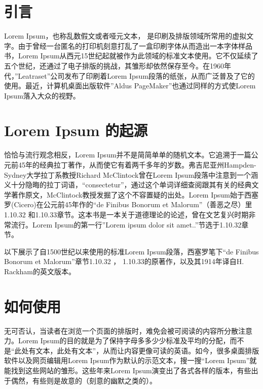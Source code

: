 \documentclass[UTF8]{ctexbook}
\begin{document}
\chapter*{引言}

Lorem Ipsum，也称乱数假文或者哑元文本， 是印刷及排版领域所常用的虚拟文字。由于曾经一台匿名的打印机刻意打乱了一盒印刷字体从而造出一本字体样品书，Lorem Ipsum从西元15世纪起就被作为此领域的标准文本使用。它不仅延续了五个世纪，还通过了电子排版的挑战，其雏形却依然保存至今。在1960年代，”Leatraset”公司发布了印刷着Lorem Ipsum段落的纸张，从而广泛普及了它的使用。最近，计算机桌面出版软件”Aldus PageMaker”也通过同样的方式使Lorem Ipsum落入大众的视野。

\chapter{Lorem Ipsum 的起源}

恰恰与流行观念相反，Lorem Ipsum并不是简简单单的随机文本。它追溯于一篇公元前45年的经典拉丁著作，从而使它有着两千多年的岁数。弗吉尼亚州Hampden-Sydney大学拉丁系教授Richard McClintock曾在Lorem Ipsum段落中注意到一个涵义十分隐晦的拉丁词语，“consectetur”，通过这个单词详细查阅跟其有关的经典文学著作原文，McClintock教授发掘了这个不容置疑的出处。Lorem Ipsum始于西塞罗(Cicero)在公元前45年作的“de Finibus Bonorum et Malorum”（善恶之尽）里1.10.32 和1.10.33章节。这本书是一本关于道德理论的论述，曾在文艺复兴时期非常流行。Lorem Ipsum的第一行”Lorem ipsum dolor sit amet..”节选于1.10.32章节。

以下展示了自1500世纪以来使用的标准Lorem Ipsum段落，西塞罗笔下“de Finibus Bonorum et Malorum”章节1.10.32 ， 1.10.33的原著作，以及其1914年译自H. Rackham的英文版本。

\chapter{如何使用}

无可否认，当读者在浏览一个页面的排版时，难免会被可阅读的内容所分散注意力。Lorem Ipsum的目的就是为了保持字母多多少少标准及平均的分配，而不是“此处有文本，此处有文本”，从而让内容更像可读的英语。如今，很多桌面排版软件以及网页编辑用Lorem Ipsum作为默认的示范文本，搜一搜“Lorem Ipsum”就能找到这些网站的雏形。这些年来Lorem Ipsum演变出了各式各样的版本，有些出于偶然，有些则是故意的（刻意的幽默之类的）。
\end{document}
